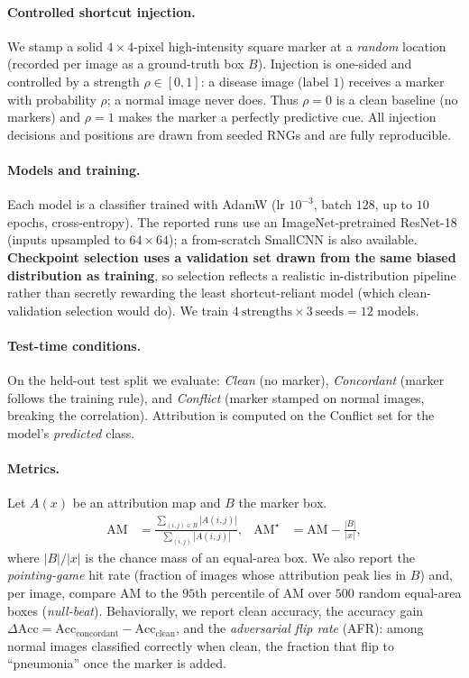 \documentclass[11pt]{article}
\begin{document}
\paragraph{Controlled shortcut injection.} We stamp a solid $4\times4$-pixel high-intensity square
marker at a \emph{random} location (recorded per image as a ground-truth box $B$). Injection is
one-sided and controlled by a strength $\rho\in[0,1]$: a disease image (label $1$) receives a marker
with probability $\rho$; a normal image never does. Thus $\rho=0$ is a clean baseline (no markers)
and $\rho=1$ makes the marker a perfectly predictive cue. All injection decisions and positions are
drawn from seeded RNGs and are fully reproducible.

\paragraph{Models and training.} Each model is a classifier trained with AdamW (lr $10^{-3}$,
batch $128$, up to $10$ epochs, cross-entropy). The reported runs use an ImageNet-pretrained
ResNet-18 \citep{he2016resnet} (inputs upsampled to $64\times64$); a from-scratch SmallCNN is also
available. \textbf{Checkpoint selection uses a validation set drawn from the same biased
distribution as training}, so selection reflects a realistic in-distribution pipeline rather than
secretly rewarding the least shortcut-reliant model (which clean-validation selection would do).
We train $4~\text{strengths}\times 3~\text{seeds}=12$ models.

\paragraph{Test-time conditions.} On the held-out test split we evaluate: \emph{Clean} (no marker),
\emph{Concordant} (marker follows the training rule), and \emph{Conflict} (marker stamped on normal
images, breaking the correlation). Attribution is computed on the Conflict set for the model's
\emph{predicted} class.

\paragraph{Metrics.} Let $A(x)$ be an attribution map and $B$ the marker box.
\begin{align}
\mathrm{AM} &= \frac{\sum_{(i,j)\in B}|A(i,j)|}{\sum_{(i,j)}|A(i,j)|},
& \mathrm{AM}^{\star} &= \mathrm{AM} - \frac{|B|}{|x|},
\end{align}
where $|B|/|x|$ is the chance mass of an equal-area box. We also report the \emph{pointing-game}
hit rate (fraction of images whose attribution peak lies in $B$) and, per image, compare
$\mathrm{AM}$ to the $95$th percentile of $\mathrm{AM}$ over $500$ random equal-area boxes
(\emph{null-beat}). Behaviorally, we report clean accuracy, the accuracy gain
$\Delta\mathrm{Acc}=\mathrm{Acc}_{\text{concordant}}-\mathrm{Acc}_{\text{clean}}$, and the
\emph{adversarial flip rate} (AFR): among normal images classified correctly when clean, the
fraction that flip to ``pneumonia'' once the marker is added.
\end{document}
